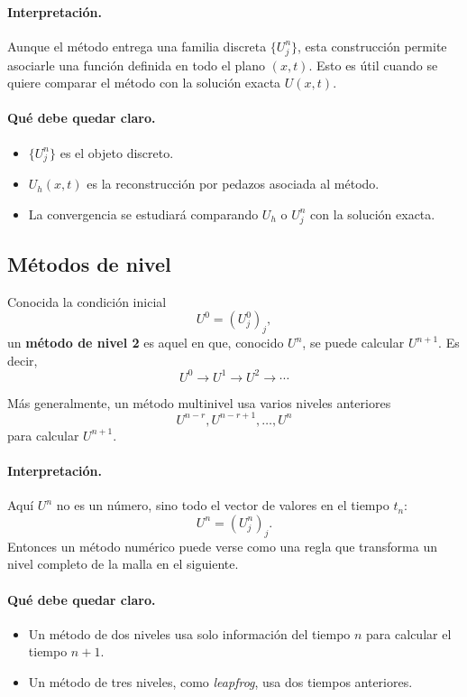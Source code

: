 \paragraph{Interpretación.}
Aunque el método entrega una familia discreta \(\{U_j^n\}\), esta construcción permite asociarle una función definida en todo el plano \((x,t)\). Esto es útil cuando se quiere comparar el método con la solución exacta \(U(x,t)\).

\paragraph{Qué debe quedar claro.}
\begin{itemize}
    \item \(\{U_j^n\}\) es el objeto discreto.
    \item \(U_h(x,t)\) es la reconstrucción por pedazos asociada al método.
    \item La convergencia se estudiará comparando \(U_h\) o \(U_j^n\) con la solución exacta.
\end{itemize}

\subsection{Métodos de nivel}

Conocida la condición inicial
\[
U^0=(U_j^0)_j,
\]
un \textbf{método de nivel 2} es aquel en que, conocido \(U^n\), se puede calcular \(U^{n+1}\). Es decir,
\[
U^0 \longrightarrow U^1 \longrightarrow U^2 \longrightarrow \cdots
\]

Más generalmente, un método multinivel usa varios niveles anteriores
\[
U^{n-r},U^{n-r+1},\dots,U^n
\]
para calcular \(U^{n+1}\).

\paragraph{Interpretación.}
Aquí \(U^n\) no es un número, sino todo el vector de valores en el tiempo \(t_n\):
\[
U^n = (U_j^n)_j.
\]
Entonces un método numérico puede verse como una regla que transforma un nivel completo de la malla en el siguiente.

\paragraph{Qué debe quedar claro.}
\begin{itemize}
    \item Un método de dos niveles usa solo información del tiempo \(n\) para calcular el tiempo \(n+1\).
    \item Un método de tres niveles, como \emph{leapfrog}, usa dos tiempos anteriores.
\end{itemize}

